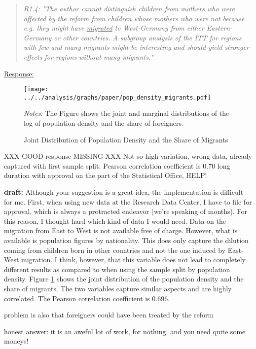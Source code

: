\bigskip\bigskip





\bigskip
{}
\begin{quote}
	\textit{R1.4: "The author cannot distinguish children from mothers who were affected by the reform from children whose mothers who were not because e.g. they might have \underline{migrated} to West-Germany from either Eastern-Germany or other countries. A subgroup analysis of the ITT for regions with few and many migrants might be interesting and should yield stronger effects for regions without many migrants."}
\end{quote}
\underline{Response:}




\begin{figure}[H] \centering
	\caption{Joint Distribution of Population Density and the Share of Migrants}\label{ref_mlch: rev_pop_mig}
	\texttt{[image: ../../analysis/graphs/paper/pop\_density\_migrants.pdf]}
	\begin{minipage}{0.9\linewidth}
		\scriptsize{\emph{Notes:} The Figure shows the joint and marginal distributions of the log of population density and the share of foreigners.}
	\end{minipage}
\end{figure}

{\color{red} XXX GOOD response MISSING XXX
Not so high variation, wrong data, already captured with first sample split: Pearson correlation coefficient is 0.70
long duration with approval on the part of the Statistical Office, HELP!

\textbf{draft:} Although your suggestion is a great idea, the implementation is difficult for me. First, when using new data at the Research Data Center, I have to file for approval, which is always a protracted endeavor (we're speaking of months). For this reason, I thought hard which kind of data I would need. Data on the migration from East to West is not available free of charge. However, what is available is population figures by nationality. This does only capture the dilution coming from children born in other countries and not the one induced by East-West migration. I think, however, that this variable does not lead to completely different results as compared to when using the sample split by population density. Figure \ref{ref_mlch: rev_pop_mig} shows the joint distribution of the population density and the share of migrants. The two variables capture similar aspects and are highly correlated. The Pearson correlation coefficient is 0.696.


problem is also that foreigners could have been treated by the reform


honest answer: it is an aweful lot of work, for nothing. and you need quite some moneys!
}


